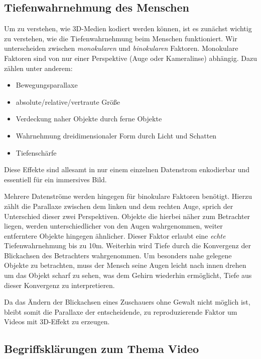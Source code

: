 \subsection{Tiefenwahrnehmung des Menschen}\label{subsec:depth-percept}
Um zu verstehen, wie 3D-Medien kodiert werden können, ist es zunächst wichtig zu verstehen, wie die Tiefenwahrnehmung
beim Menschen funktioniert.
Wir unterscheiden zwischen \textit{monokularen} und \textit{binokularen} Faktoren.
Monokulare Faktoren sind von nur einer Perspektive (Auge oder Kameralinse) abhängig.
Dazu zählen unter anderem:
\begin{itemize}
    \item Bewegungsparallaxe
    \item absolute/relative/vertraute Größe
    \item Verdeckung naher Objekte durch ferne Objekte
    \item Wahrnehmung dreidimensionaler Form durch Licht und Schatten
    \item Tiefenschärfe
\end{itemize}
Diese Effekte sind allesamt in nur einem einzelnen Datenstrom enkodierbar und essentiell für ein immersives Bild.

\noindent\newline Mehrere Datenströme werden hingegen für binokulare Faktoren benötigt.
Hierzu zählt die Parallaxe zwischen dem linken und dem rechten Auge, sprich der Unterschied dieser zwei Perspektiven.
Objekte die hierbei näher zum Betrachter liegen, werden unterschiedlicher von den Augen wahrgenommen, weiter entferntere
Objekte hingegen ähnlicher.
Dieser Faktor erlaubt eine \textit{echte} Tiefenwahrnehmung bis zu 10m.
Weiterhin wird Tiefe durch die Konvergenz der Blickachsen des Betrachters wahrgenommen.
Um besonders nahe gelegene Objekte zu betrachten, muss der Mensch seine Augen leicht nach innen drehen um das Objekt
scharf zu sehen, was dem Gehirn wiederhin ermöglicht, Tiefe aus dieser Konvergenz zu interpretieren.

\noindent\newline Da das Ändern der Blickachsen eines Zuschauers ohne Gewalt nicht möglich ist, bleibt somit die
Parallaxe der entscheidende, zu reproduzierende Faktor um Videos mit 3D-Effekt zu erzeugen.
\pagebreak


\subsection{Begriffsklärungen zum Thema Video}\label{subsec:video-terms}
